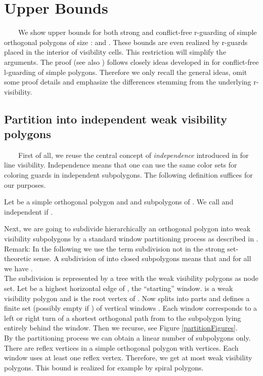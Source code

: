 \documentclass[a4paper,USenglish,numberwithinsect]{lipics}
\theoremstyle{plain}
\begin{document}
\section{Upper Bounds }
\ \ \ \ We show  upper bounds for both strong and conflict-free r-guarding of
simple orthogonal polygons of size :  and 
. These bounds are even  realized by r-guards
placed in the interior of visibility cells. This restriction will
simplify the arguments.  The proof (see also \cite{Wi}) follows closely ideas
developed in \cite{B_etal, BS} for conflict-free
l-guarding of simple  polygons. Therefore we only recall the
general ideas, omit some proof details and emphasize the differences
stemming from the underlying r-visibility. 
 







\subsection{Partition into independent weak visibility polygons}
\ \ \ \ First of all, we reuse the central concept of {\it independence} introduced
in \cite{BS, B_etal} for line
visibility. Independence means that one can use the same color sets for
coloring guards in independent subpolygons.
 The following definition  suffices for our purposes.

\begin{definition}
Let  be a simple orthogonal polygon and   and 
subpolygons of .
 We call  and   independent if  .
\end{definition}

Next, we are going to subdivide hierarchically an orthogonal polygon 
into  weak visibility subpolygons by a standard window partitioning
process as  described in \cite{BS}. \\
Remark: In the following we use the term subdivision not in the strong set-theoretic sense. A subdivision of   into closed subpolygons  means that 
 and for all  we have . \\
The subdivision is
represented by a tree
 with the weak
 visibility polygons as node set. Let   be a highest horizontal edge
of , the ``starting'' window.   is a weak
visibility polygon and is the root vertex  of . Now  splits
 into parts and defines a finite set (possibly empty if ) of
vertical windows . Each window  corresponds to a left or
right turn of a shortest orthogonal path from  to the subpolygon
lying entirely behind the window. Then we recurse, see Figure \ref{partitionFigures}.\\
By the partitioning process we can obtain a linear number of subpolygons only. There are  reflex vertices in a simple orthogonal polygon
 with  vertices. Each window uses at least one reflex vertex. Therefore,
we get at most  weak visibility polygons. This bound is realized for example by spiral polygons.
\end{document}
